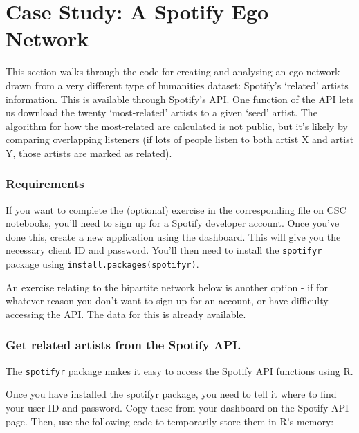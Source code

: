 \documentclass[
]{book}
\begin{document}
\hypertarget{case-study-a-spotify-ego-network}{%
\section{Case Study: A Spotify Ego Network}\label{case-study-a-spotify-ego-network}}

This section walks through the code for creating and analysing an ego network drawn from a very different type of humanities dataset: Spotify's `related' artists information. This is available through Spotify's API. One function of the API lets us download the twenty `most-related' artists to a given `seed' artist. The algorithm for how the most-related are calculated is not public, but it's likely by comparing overlapping listeners (if lots of people listen to both artist X and artist Y, those artists are marked as related).

\hypertarget{requirements}{%
\subsubsection{Requirements}\label{requirements}}

If you want to complete the (optional) exercise in the corresponding file on CSC notebooks, you'll need to sign up for a Spotify developer account. Once you've done this, create a new application using the dashboard. This will give you the necessary client ID and password. You'll then need to install the \texttt{spotifyr} package using \texttt{install.packages(\textquotesingle{}spotifyr)}.

An exercise relating to the bipartite network below is another option - if for whatever reason you don't want to sign up for an account, or have difficulty accessing the API. The data for this is already available.

\hypertarget{get-related-artists-from-the-spotify-api.}{%
\subsubsection{Get related artists from the Spotify API.}\label{get-related-artists-from-the-spotify-api.}}

The \texttt{spotifyr} package makes it easy to access the Spotify API functions using R.

Once you have installed the spotifyr package, you need to tell it where to find your user ID and password. Copy these from your dashboard on the Spotify API page. Then, use the following code to temporarily store them in R's memory:
\end{document}
